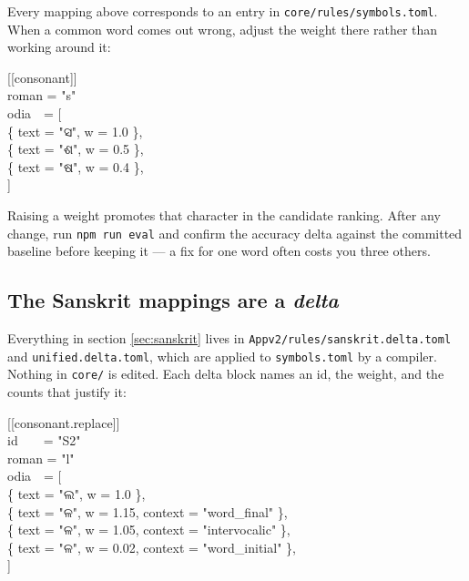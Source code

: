 \documentclass[11pt, a4paper]{article}
\newcommand{\od}[1]{{\odiafont #1}}          %
\begin{document}
Every mapping above corresponds to an entry in \texttt{core/rules/symbols.toml}. When a
common word comes out wrong, adjust the weight there rather than working around it:

\begin{center}
\begin{minipage}{0.72\textwidth}
\ttfamily\small
\color{midseapurple}[[consonant]]\color{black}\\
roman = "s"\\
odia~~= [\\
\hspace*{2em}\{ text = "\od{ସ}", w = 1.0 \},\\
\hspace*{2em}\{ text = "\od{ଶ}", w = 0.5 \},\\
\hspace*{2em}\{ text = "\od{ଷ}", w = 0.4 \},\\
]
\end{minipage}
\end{center}

Raising a weight promotes that character in the candidate ranking. After any change, run
\texttt{npm run eval} and confirm the accuracy delta against the committed baseline
before keeping it --- a fix for one word often costs you three others.

\subsection*{The Sanskrit mappings are a \emph{delta}}

Everything in section \ref{sec:sanskrit} lives in
\texttt{Appv2/rules/sanskrit.delta.toml} and \texttt{unified.delta.toml}, which are
applied to \texttt{symbols.toml} by a compiler. Nothing in \texttt{core/} is edited. Each
delta block names an id, the weight, and the counts that justify it:

\begin{center}
\begin{minipage}{0.78\textwidth}
\ttfamily\small
\color{midseapurple}[[consonant.replace]]\color{black}\\
id~~~~= "S2"\\
roman = "l"\\
odia~~= [\\
\hspace*{2em}\{ text = "\od{ଲ}", w = 1.0 \},\\
\hspace*{2em}\{ text = "\od{ଳ}", w = 1.15, context = "word\_final" \},\\
\hspace*{2em}\{ text = "\od{ଳ}", w = 1.05, context = "intervocalic" \},\\
\hspace*{2em}\{ text = "\od{ଳ}", w = 0.02, context = "word\_initial" \},\\
]
\end{minipage}
\end{center}
\end{document}
